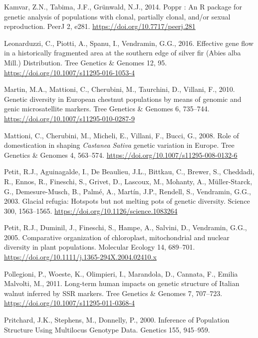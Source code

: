 \documentclass[12pt,a4paper,]{report}
\begin{document}
\leavevmode\hypertarget{ref-Kamvar2014}{}%
Kamvar, Z.N., Tabima, J.F., Grünwald, N.J., 2014. Poppr : An R package
for genetic analysis of populations with clonal, partially clonal,
and/or sexual reproduction. PeerJ 2, e281.
\url{https://doi.org/10.7717/peerj.281}

\leavevmode\hypertarget{ref-Leonarduzzi2016a}{}%
Leonarduzzi, C., Piotti, A., Spanu, I., Vendramin, G.G., 2016. Effective
gene flow in a historically fragmented area at the southern edge of
silver fir (Abies alba Mill.) Distribution. Tree Genetics \& Genomes 12,
95. \url{https://doi.org/10.1007/s11295-016-1053-4}

\leavevmode\hypertarget{ref-martin_genetic_2010}{}%
Martin, M.A., Mattioni, C., Cherubini, M., Taurchini, D., Villani, F.,
2010. Genetic diversity in European chestnut populations by means of
genomic and genic microsatellite markers. Tree Genetics \& Genomes 6,
735--744. \url{https://doi.org/10.1007/s11295-010-0287-9}

\leavevmode\hypertarget{ref-Mattioni2008}{}%
Mattioni, C., Cherubini, M., Micheli, E., Villani, F., Bucci, G., 2008.
Role of domestication in shaping \emph{Castanea} \emph{Sativa} genetic
variation in Europe. Tree Genetics \& Genomes 4, 563--574.
\url{https://doi.org/10.1007/s11295-008-0132-6}

\leavevmode\hypertarget{ref-Petit2003}{}%
Petit, R.J., Aguinagalde, I., De Beaulieu, J.L., Bittkau, C., Brewer,
S., Cheddadi, R., Ennos, R., Fineschi, S., Grivet, D., Lascoux, M.,
Mohanty, A., Müller-Starck, G., Demesure-Musch, B., Palmé, A., Martín,
J.P., Rendell, S., Vendramin, G.G., 2003. Glacial refugia: Hotspots but
not melting pots of genetic diversity. Science 300, 1563--1565.
\url{https://doi.org/10.1126/science.1083264}

\leavevmode\hypertarget{ref-Petit2005}{}%
Petit, R.J., Duminil, J., Fineschi, S., Hampe, A., Salvini, D.,
Vendramin, G.G., 2005. Comparative organization of chloroplast,
mitochondrial and nuclear diversity in plant populations. Molecular
Ecology 14, 689--701.
\url{https://doi.org/10.1111/j.1365-294X.2004.02410.x}

\leavevmode\hypertarget{ref-Pollegioni2011}{}%
Pollegioni, P., Woeste, K., Olimpieri, I., Marandola, D., Cannata, F.,
Emilia Malvolti, M., 2011. Long-term human impacts on genetic structure
of Italian walnut inferred by SSR markers. Tree Genetics \& Genomes 7,
707--723. \url{https://doi.org/10.1007/s11295-011-0368-4}

\leavevmode\hypertarget{ref-pritchard_inference_2000}{}%
Pritchard, J.K., Stephens, M., Donnelly, P., 2000. Inference of
Population Structure Using Multilocus Genotype Data. Genetics 155,
945--959.
\end{document}
